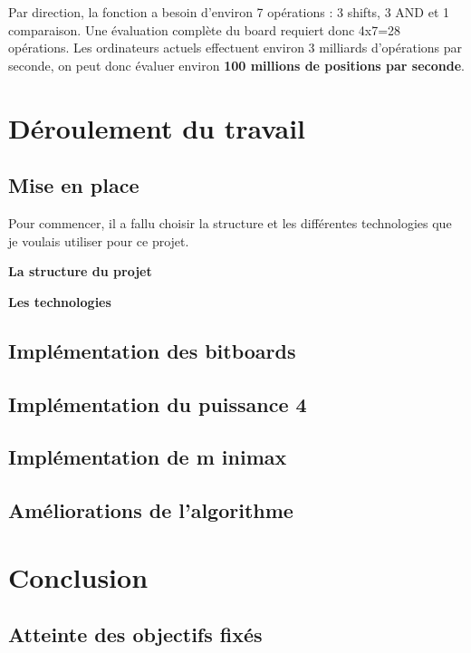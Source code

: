 \documentclass[a4paper]{article}
\newcommand{\ptitle}[1]{\vspace{10pt}
{\large \textbf{#1}}}
\begin{document}
    Par direction, la fonction a besoin d'environ 7 opérations : 3 shifts, 3 AND et 1 comparaison. Une évaluation complète du board requiert donc 4x7=28 opérations. Les ordinateurs actuels effectuent environ 3 milliards d'opérations par seconde, on peut donc évaluer environ \textbf{100 millions de positions par seconde}.

\section{Déroulement du travail}

\subsection{Mise en place}

    Pour commencer, il a fallu choisir la structure et les différentes technologies que je voulais utiliser pour ce projet.

    \ptitle{La structure du projet}

    \ptitle{Les technologies}

\subsection{Implémentation des bitboards}

\subsection{Implémentation du puissance 4}

\subsection{Implémentation de m inimax}

\subsection{Améliorations de l'algorithme}


\section{Conclusion}
\subsection{Atteinte des objectifs fixés}
\end{document}

